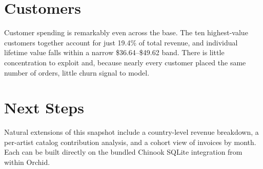 \documentclass[11pt]{article}
\begin{document}
\section{Customers}
Customer spending is remarkably even across the base. The ten highest-value customers together
account for just 19.4\% of total revenue, and individual lifetime value falls within a narrow
\$36.64--\$49.62 band. There is little concentration to exploit and, because nearly every
customer placed the same number of orders, little churn signal to model.

\section{Next Steps}
Natural extensions of this snapshot include a country-level revenue breakdown, a per-artist
catalog contribution analysis, and a cohort view of invoices by month. Each can be built
directly on the bundled Chinook SQLite integration from within Orchid.
\end{document}
